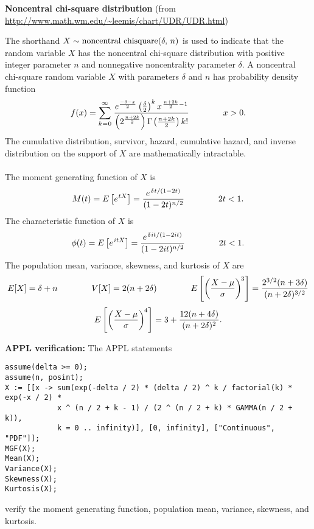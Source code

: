 \documentclass[12pt,fullpage]{article}
\begin{document}
\noindent
{\bf Noncentral chi-square distribution} (from \color{blue}\url{http://www.math.wm.edu/~leemis/chart/UDR/UDR.html}\color{black})

\noindent
The shorthand $X \sim {\rm noncentral\  chisquare}(\delta,\, n)$ is used to indicate that the
random variable $X$ has the noncentral chi-square distribution with positive integer parameter $n$ and
nonnegative noncentrality parameter $\delta$.
A noncentral chi-square random variable $X$ with parameters $\delta$ and $n$ has probability density function 
$$
f(x) = \sum_{k \kern 0.04 em = \kern 0.04 em 0} ^ {\infty} \kern 0.10 em \frac{e ^ {\frac{-\delta - x} {2}} \left( \frac{\delta} {2}\right) ^ k x ^ {\kern 0.08 em \frac{n + 2k} {2} - 1}}
{\left(2 ^ {\frac{n + 2k} {2}} \right) \Gamma \kern -0.08 em \left(\frac{n + 2k} {2} \right) k!} \qquad \qquad x > 0.
$$
The cumulative distribution, survivor, hazard, 
cumulative hazard, and inverse distribution on the support of $X$ are mathematically intractable.\\
\\
\noindent
The moment generating function of $X$ is
$$
M(t) = E\left[ e ^ {\kern 0.04em tX} \right] =  \frac{e ^ {\kern 0.08 em \delta \kern 0.04 em t / (1 - 2t)}} {(1 - 2t) ^ {n / 2}} \qquad \qquad 2t < 1.
$$
The characteristic function of $X$ is
$$
\phi(t) = E\left[ e ^ {\kern 0.08 em itX} \right] =  \frac{e ^ {\kern 0.08 em \delta \kern 0.04 em it / (1 - 2 it)}} {(1 - 2 it) ^ {n / 2}} \qquad \qquad 2t < 1.
$$
The population mean, variance, skewness, and kurtosis of $X$ are 
$$
E[X] = \delta + n \qquad \qquad 
V[X] = 2 (n + 2 \delta) \qquad \qquad 
E\left[ \left( \frac{X - \mu} {\sigma} \right) ^ {\kern -0.08 em 3} \right] = \frac{2 ^ {3 / 2}(n + 3 \delta)} {(n + 2 \delta) ^ {3 / 2}}
$$
$$
E\left[ \left( \frac{X - \mu} {\sigma} \right) ^ {\kern -0.08 em 4} \right] = 3 + \frac{12 (n + 4 \delta)} {(n + 2 \delta) ^ 2}.
$$

\vspace{0.1in}

\noindent
{\bf APPL verification:}
The APPL statements
\begin{verbatim}
assume(delta >= 0);
assume(n, posint);
X := [[x -> sum(exp(-delta / 2) * (delta / 2) ^ k / factorial(k) * exp(-x / 2) *
            x ^ (n / 2 + k - 1) / (2 ^ (n / 2 + k) * GAMMA(n / 2 + k)),
            k = 0 .. infinity)], [0, infinity], ["Continuous", "PDF"]];
MGF(X);
Mean(X);
Variance(X);
Skewness(X);
Kurtosis(X);
\end{verbatim}
verify the moment generating function, population mean, variance, skewness, and kurtosis.
\end{document}
